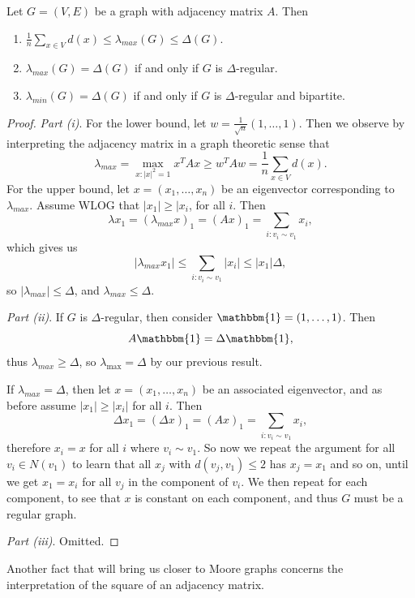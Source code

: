 \documentclass[a4paper]{scrartcl}
\begin{document}
\begin{proposition}
	Let $G = (V, E)$ be a graph with adjacency matrix $A$. Then
	\begin{enumerate}[label=(\roman*)]
		\item $\frac{1}{n}\sum_{x \in V} d(x) \leq \lambda_{max}(G) \leq \Delta(G)$.
		\item $\lambda_{max}(G) = \Delta(G)$ if and only if $G$ is $\Delta$-regular.
		\item $\lambda_{min}(G) = \Delta(G)$ if and only if $G$ is $\Delta$-regular and bipartite.
	\end{enumerate}
\end{proposition}
\begin{proof}
	\emph{Part (i)}. For the lower bound, let $w = \frac{1}{\sqrt{n}}(1, \dots, 1)$. Then we observe by interpreting the adjacency matrix in a graph theoretic sense that
	$$
	\lambda_{max} = \max_{x : |x|^2 = 1} x^T A x \geq w^T Aw = \frac{1}{n}\sum_{x \in V} d(x).
	$$
	For the upper bound, let $x = (x_1, \dots, x_n)$ be an eigenvector corresponding to $\lambda_{max}$. Assume WLOG that $|x_1| \geq |x_i$, for all $i$. Then
	$$
	\lambda x_1 = (\lambda_{max} x)_1 = (Ax)_1 = \sum_{i:v_i \sim v_1} x_i,
	$$
	which gives us
	$$
	|\lambda_{max} x_1| \leq \sum_{i: v_i \sim v_1} |x_i| \leq |x_1|\Delta,
	$$
	so $|\lambda_{max}| \leq \Delta$, and $\lambda_{max} \leq \Delta$.

	\emph{Part (ii)}. If $G$ is $\Delta$-regular, then consider $\mathbbm{1} = (1, \dots, 1)$. Then
	$$
A \mathbbm{1} = \Delta\mathbbm{1},
	$$
	thus $\lambda_{max} \geq \Delta$, so $\lambda_{\max} = \Delta$ by our previous result. 

	If $\lambda_{max} = \Delta$, then let $x = (x_1, \dots, x_n)$ be an associated eigenvector, and as before assume $|x_1| \geq |x_i|$ for all $i$. Then
	$$
	\Delta x_1 = (\Delta x)_1 = (Ax)_1 = \sum_{i:v_i \sim v_1} x_i,
	$$
	therefore $x_i = x$ for all $i$ where $v_i \sim v_1$. So now we repeat the argument for all $v_i \in N(v_1)$ to learn that all $x_j$ with $d(v_j, v_1) \leq 2$ has $x_j = x_1$ and so on, until we get $x_1 = x_i$ for all $v_j$ in the component of $v_i$. We then repeat for each component, to see that $x$ is constant on each component, and thus $G$ must be a regular graph.

	\emph{Part (iii)}. Omitted.
\end{proof}

Another fact that will bring us closer to Moore graphs concerns the interpretation of the square of an adjacency matrix.
\end{document}
